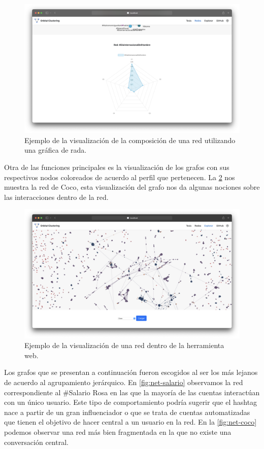  \begin{figure}
   \centering
   \includegraphics[width=1\textwidth]{images/web-comp.png}
    \caption{Ejemplo de la visualización de la composición de una red utilizando una gráfica de rada.}
    \label{img:web-comp}
\end{figure}

Otra de las funciones principales es la visualización de los grafos con sus respectivos nodos coloreados de acuerdo al perfil que pertenecen. La \ref{img:web-graph} nos muestra la red de Coco, esta visualización del grafo nos da algunas nociones sobre las interacciones dentro de la red.

 \begin{figure}
   \centering
   \includegraphics[width=1\textwidth]{images/web-graph.png}
    \caption{Ejemplo de la visualización de una red dentro de la herramienta web.}
    \label{img:web-graph}
\end{figure}

Los grafos que se presentan a continuación fueron escogidos al ser los más lejanos de acuerdo al agrupamiento jerárquico. En \ref{fig:net-salario} observamos la red correspondiente al \#Salario Rosa en las que la mayoría de las cuentas interactúan con un único usuario. Este tipo de comportamiento podría sugerir que el hashtag nace a partir de un gran influenciador o que se trata de cuentas automatizadas que tienen el objetivo de hacer central a un usuario en la red. En la \ref{fig:net-coco} podemos observar una red más bien fragmentada en la que no existe una conversación central.

